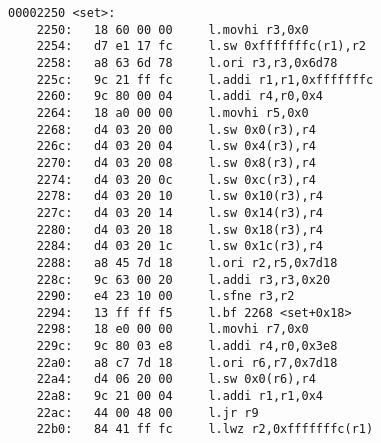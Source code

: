 \begin{lstlisting}[frame=single]
00002250 <set>:
    2250:	18 60 00 00 	l.movhi r3,0x0
    2254:	d7 e1 17 fc 	l.sw 0xfffffffc(r1),r2
    2258:	a8 63 6d 78 	l.ori r3,r3,0x6d78
    225c:	9c 21 ff fc 	l.addi r1,r1,0xfffffffc
    2260:	9c 80 00 04 	l.addi r4,r0,0x4
    2264:	18 a0 00 00 	l.movhi r5,0x0
    2268:	d4 03 20 00 	l.sw 0x0(r3),r4
    226c:	d4 03 20 04 	l.sw 0x4(r3),r4
    2270:	d4 03 20 08 	l.sw 0x8(r3),r4
    2274:	d4 03 20 0c 	l.sw 0xc(r3),r4
    2278:	d4 03 20 10 	l.sw 0x10(r3),r4
    227c:	d4 03 20 14 	l.sw 0x14(r3),r4
    2280:	d4 03 20 18 	l.sw 0x18(r3),r4
    2284:	d4 03 20 1c 	l.sw 0x1c(r3),r4
    2288:	a8 45 7d 18 	l.ori r2,r5,0x7d18
    228c:	9c 63 00 20 	l.addi r3,r3,0x20
    2290:	e4 23 10 00 	l.sfne r3,r2
    2294:	13 ff ff f5 	l.bf 2268 <set+0x18>
    2298:	18 e0 00 00 	l.movhi r7,0x0
    229c:	9c 80 03 e8 	l.addi r4,r0,0x3e8
    22a0:	a8 c7 7d 18 	l.ori r6,r7,0x7d18
    22a4:	d4 06 20 00 	l.sw 0x0(r6),r4
    22a8:	9c 21 00 04 	l.addi r1,r1,0x4
    22ac:	44 00 48 00 	l.jr r9
    22b0:	84 41 ff fc 	l.lwz r2,0xfffffffc(r1)
    
	\end{lstlisting}

